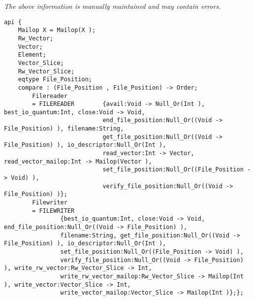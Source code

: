 \label{api:Winix\_Base\_File\_Io\_Driver\_For\_Os}

{\tiny \it The above information is manually maintained and may contain errors.}
\begin{verbatim}
api {
    Mailop X = Mailop(X );
    Rw_Vector;
    Vector;
    Element;
    Vector_Slice;
    Rw_Vector_Slice;
    eqtype File_Position;
    compare : (File_Position , File_Position) -> Order;
        Filereader
        = FILEREADER        {avail:Void -> Null_Or(Int ), best_io_quantum:Int, close:Void -> Void,
                            end_file_position:Null_Or((Void -> File_Position) ), filename:String,
                            get_file_position:Null_Or((Void -> File_Position) ), io_descriptor:Null_Or(Int ),
                            read_vector:Int -> Vector, read_vector_mailop:Int -> Mailop(Vector ),
                            set_file_position:Null_Or((File_Position -> Void) ),
                            verify_file_position:Null_Or((Void -> File_Position) )};
        Filewriter
        = FILEWRITER
                {best_io_quantum:Int, close:Void -> Void, end_file_position:Null_Or((Void -> File_Position) ),
                filename:String, get_file_position:Null_Or((Void -> File_Position) ), io_descriptor:Null_Or(Int ),
                set_file_position:Null_Or((File_Position -> Void) ),
                verify_file_position:Null_Or((Void -> File_Position) ), write_rw_vector:Rw_Vector_Slice -> Int,
                write_rw_vector_mailop:Rw_Vector_Slice -> Mailop(Int ), write_vector:Vector_Slice -> Int,
                write_vector_mailop:Vector_Slice -> Mailop(Int )};};
\end{verbatim}
